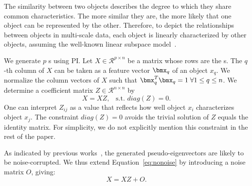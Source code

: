 The similarity between two objects describes the degree to which they share common characteristics.
The more similar they are, 
the more likely that one object can be represented by the other. 
Therefore,
to depict the relationships between objects in multi-scale data,
each object is linearly characterized by other objects,
assuming the well-known linear subspace model~\cite{liu2013robust}.

We generate $p$ {\pev}s using PI. 
Let $X\in \mathcal{R}^{p\times n}$ be a matrix whose rows are the {\pev}s.
The $q$-th column of $X$ can be taken as a feature vector $\bmx_q$ of an object $x_q$.
We normalize the column vectors of $X$ such that $\bmx_q^T \bmx_q = 1 \; \forall 1 \leq q \leq n$.
We determine a coefficient matrix $Z \in \mathcal{R}^{n \times n}$ by
\begin{equation}
\label{eq:nonoise}
X = XZ,\;\;\; \text{s.t. } diag(Z) = 0.
\end{equation} 
One can interpret $Z_{ij}$ 
as a value that reflects how well object $x_i$ characterizes object $x_j$.
The constraint $diag(Z) = 0$ avoids the trivial solution of $Z$ equals the identity matrix.
For simplicity, we do not explicitly mention this constraint in the rest of the paper.

As indicated by previous works~\cite{ye2016fuse}, the generated pseudo-eigenvectors are likely to be noise-corrupted.
We thus extend Equation~\ref{eq:nonoise} by introducing a noise matrix $O$, giving:
\begin{equation}
X = XZ + O.
\label{eq:O}
\end{equation} 

